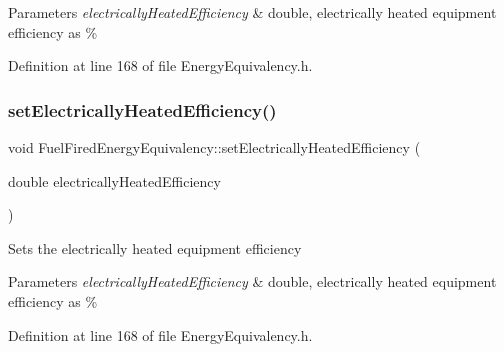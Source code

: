 \begin{DoxyParams}{Parameters}
{\em electrically\+Heated\+Efficiency} & double, electrically heated equipment efficiency as \% \\
\hline
\end{DoxyParams}


Definition at line 168 of file Energy\+Equivalency.\+h.

\mbox{\label{class_fuel_fired_energy_equivalency_a2e8e166d9824ee07805cd790eff5e361}} 
\subsubsection{\texorpdfstring{set\+Electrically\+Heated\+Efficiency()}{setElectricallyHeatedEfficiency()}\hspace{0.1cm}{\footnotesize\ttfamily [2/3]}}
{\footnotesize\ttfamily void Fuel\+Fired\+Energy\+Equivalency\+::set\+Electrically\+Heated\+Efficiency (\begin{DoxyParamCaption}\item[{double}]{electrically\+Heated\+Efficiency }\end{DoxyParamCaption})\hspace{0.3cm}{\ttfamily [inline]}}

Sets the electrically heated equipment efficiency


\begin{DoxyParams}{Parameters}
{\em electrically\+Heated\+Efficiency} & double, electrically heated equipment efficiency as \% \\
\hline
\end{DoxyParams}


Definition at line 168 of file Energy\+Equivalency.\+h.

\mbox{\label{class_fuel_fired_energy_equivalency_a2e8e166d9824ee07805cd790eff5e361}} 

